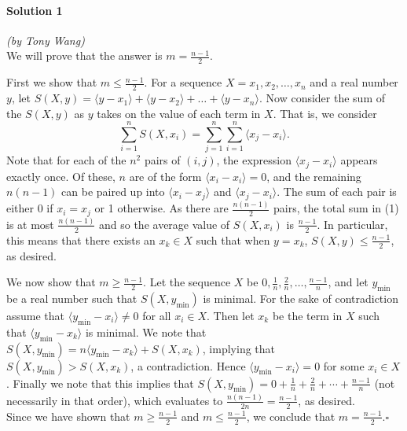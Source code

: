 \documentclass[10pt]{article}
\begin{document}
	\paragraph{Solution 1} \textit{(by Tony Wang)}\\
	
	\noindent We will prove that the answer is \(m = \frac{n-1}{2}\).
	
	First we show that \(m \leq \frac{n-1}{2}\). For a sequence \(X = x_1, x_2, \dots, x_n\) and a real number \(y\), let \(S(X,y) = \langle y - x_1 \rangle + \langle y - x_2 \rangle + \dots + \langle y - x_n \rangle\). Now consider the sum of the \(S(X,y)\) as \(y\) takes on the value of each term in \(X\). That is, we consider \begin{equation}
	\sum_{i=1}^n S(X,x_i) = \sum_{j=1}^n \sum_{i=1}^n \langle x_j - x_i \rangle.
	\end{equation} Note that for each of the \(n^2\) pairs of \((i,j)\), the expression \(\langle x_j - x_i \rangle\) appears exactly once. Of these, \(n\) are of the form \(\langle x_i - x_i \rangle = 0\), and the remaining \(n(n-1)\) can be paired up into \(\langle x_i - x_j \rangle\) and \(\langle x_j - x_i \rangle\). The sum of each pair is either 0 if \(x_i = x_j\) or 1 otherwise. As there are \(\frac{n(n-1)}{2}\) pairs, the total sum in (1) is at most \(\frac{n(n-1)}{2}\) and so the average value of \(S(X,x_i)\) is \(\frac{n-1}{2}\). In particular, this means that there exists an \(x_k \in X\) such that when \(y = x_k\), \(S(X,y) \leq \frac{n-1}{2}\), as desired.
	
	We now show that \(m \geq \frac{n-1}{2}\). Let the sequence \(X\) be \(0, \frac 1n, \frac 2n, \dots, \frac{n-1}{n}\), and let \(y_{\text{min}}\) be a real number such that \(S(X, y_{\text{min}})\) is minimal. For the sake of contradiction assume that \(\langle y_{\text{min}} - x_i \rangle \neq 0\) for all \(x_i \in X\). Then let \(x_k\) be the term in \(X\) such that \(\langle y_{\text{min}} - x_k \rangle\) is minimal. We note that \(S(X,y_{\text{min}}) = n \langle y_{\text{min}} - x_k \rangle + S(X,x_k)\), implying that \(S(X, y_{\text{min}}) > S(X, x_k)\), a contradiction. Hence \(\langle y_{\text{min}} - x_i \rangle = 0\) for some \(x_i \in X\). Finally we note that this implies that \(S(X,y_{\text{min}}) = 0 + \frac 1n + \frac 2n + \cdots + \frac{n-1}{n}\) (not necessarily in that order), which evaluates to \(\frac{n(n-1)}{2n} = \frac{n-1}{2}\), as desired.\\[-10pt]
	
	Since we have shown that \(m \geq \frac{n-1}{2}\) and \(m \leq \frac{n-1}{2}\), we conclude that \(m = \frac{n-1}{2}\).\hfill\ensuremath{\square}\\
	
\end{document}
